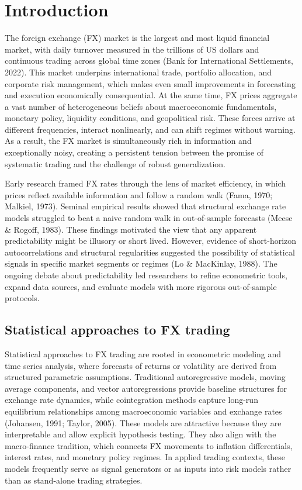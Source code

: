 \documentclass[12pt,a4paper]{article}
\begin{document}
\section{Introduction}

The foreign exchange (FX) market is the largest and most liquid financial market, with daily turnover measured in the trillions of US dollars and continuous trading across global time zones (Bank for International Settlements, 2022). This market underpins international trade, portfolio allocation, and corporate risk management, which makes even small improvements in forecasting and execution economically consequential. At the same time, FX prices aggregate a vast number of heterogeneous beliefs about macroeconomic fundamentals, monetary policy, liquidity conditions, and geopolitical risk. These forces arrive at different frequencies, interact nonlinearly, and can shift regimes without warning. As a result, the FX market is simultaneously rich in information and exceptionally noisy, creating a persistent tension between the promise of systematic trading and the challenge of robust generalization.

Early research framed FX rates through the lens of market efficiency, in which prices reflect available information and follow a random walk (Fama, 1970; Malkiel, 1973). Seminal empirical results showed that structural exchange rate models struggled to beat a naive random walk in out-of-sample forecasts (Meese \& Rogoff, 1983). These findings motivated the view that any apparent predictability might be illusory or short lived. However, evidence of short-horizon autocorrelations and structural regularities suggested the possibility of statistical signals in specific market segments or regimes (Lo \& MacKinlay, 1988). The ongoing debate about predictability led researchers to refine econometric tools, expand data sources, and evaluate models with more rigorous out-of-sample protocols.

\subsection{Statistical approaches to FX trading}

Statistical approaches to FX trading are rooted in econometric modeling and time series analysis, where forecasts of returns or volatility are derived from structured parametric assumptions. Traditional autoregressive models, moving average components, and vector autoregressions provide baseline structures for exchange rate dynamics, while cointegration methods capture long-run equilibrium relationships among macroeconomic variables and exchange rates (Johansen, 1991; Taylor, 2005). These models are attractive because they are interpretable and allow explicit hypothesis testing. They also align with the macro-finance tradition, which connects FX movements to inflation differentials, interest rates, and monetary policy regimes. In applied trading contexts, these models frequently serve as signal generators or as inputs into risk models rather than as stand-alone trading strategies.
\end{document}
